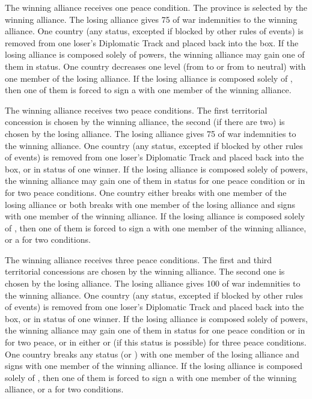  The winning alliance receives one peace
condition.
 The province is selected by the winning
alliance.
\bparag[Indemnities] The losing alliance gives 75 \ducats of war indemnities
to the winning alliance.
 One country (any status, excepted if
blocked by other rules of events) is removed from one loser's Diplomatic Track
and placed back into the \Neutral box. If the losing alliance is composed
solely of \MIN powers, the winning alliance may gain one of them in \MR
status.
 One \ROTW country decreases one level
(from \dipAT to \dipFR or from \dipFR to neutral) with one member of the losing
alliance. If the losing alliance is composed solely of \MIN, then one of them
is forced to sign a \dipFR with one member of the winning alliance.

 The winning alliance receives two peace conditions.
 The first territorial concession is chosen by
the winning alliance, the second (if there are two) is chosen by the losing
alliance.
\bparag[Indemnities] The losing alliance gives 75 \ducats of war indemnities
to the winning alliance.
 One country (any status, excepted if
blocked by other rules of events) is removed from one loser's Diplomatic Track
and placed back into the \Neutral box, or in \MR status of one winner. If the
losing alliance is composed solely of \MIN powers, the winning alliance may
gain one of them in \MR status for one peace condition or in \AM for two peace
conditions.
 One \ROTW country either breaks \dipAT
with one member of the losing alliance or both breaks \dipFR with one member
of the losing alliance and signs \dipFR with one member of the winning
alliance. If the losing alliance is composed solely of \MIN, then one of them
is forced to sign a \dipFR with one member of the winning alliance, or a
\dipAT for two conditions.

 The winning alliance receives three peace
conditions.
 The first and third territorial concessions
are chosen by the winning alliance. The second one is chosen by the losing
alliance.
\bparag[Indemnities] The losing alliance gives 100 \ducats of war indemnities
to the winning alliance.
 One country (any status, excepted if
blocked by other rules of events) is removed from one loser's Diplomatic Track
and placed back into the \Neutral box, or in \MR status of one winner. If the
losing alliance is composed solely of \MIN powers, the winning alliance may
gain one of them in \MR status for one peace condition or in \AM for two
peace, or in either \EG or \VASSAL (if this status is possible) for three
peace conditions.
 One \ROTW country breaks any status
(\dipFR or \dipAT) with one member of the losing alliance and signs \dipFR
with one member of the winning alliance. If the losing alliance is composed
solely of \MIN, then one of them is forced to sign a \dipFR with one member of
the winning alliance, or a \dipAT for two conditions.


